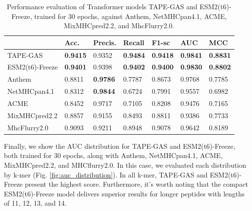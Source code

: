 \begin{table}[]
	\centering
	\caption{Performance evaluation of Transformer models TAPE-GAS and ESM2(t6)-Freeze, trained for 30 epochs, against Anthem, NetMHCpan4.1, ACME, MixMHCpred2.2, and MhcFlurry2.0.}
	\label{tab:final_comparison}
	\tiny
	\begin{tabular}{lllllll} \hline
		& \textbf{Acc.} & \textbf{Precis.} & \textbf{Recall} & \textbf{F1-sc} & \textbf{AUC}    & \textbf{MCC}    \\ \hline
		TAPE-GAS        & \textbf{0.9415}   & 0.9352             & \textbf{0.9484} & \textbf{0.9418}   & \textbf{0.9841} & \textbf{0.8831} \\
		ESM2(t6)-Freeze & \textbf{0.9401}   & 0.9398             & \textbf{0.9402} & \textbf{0.9400}   & \textbf{0.9830} & \textbf{0.8802} \\
		
		Anthem          & 0.8811            & \textbf{0.9786}    & 0.7787          & 0.8673            & 0.9768          & 0.7785          \\
		NetMHCpan4.1    & 0.8312            & \textbf{0.9844}    & 0.6724          & 0.7991            & 0.9557          & 0.6982          \\
		
		ACME            & 0.8452            & 0.9717             & 0.7105          & 0.8208            & 0.9476          & 0.7165          \\
		MixMHCpred2.2   & 0.8857            & 0.9155             & 0.8493          & 0.8811            & 0.9386          & 0.7733          \\
		MhcFlurry2.0    & 0.9093            & 0.9211             & 0.8948          & 0.9078            & 0.9642          & 0.8189 \\ \hline        
	\end{tabular}
\end{table}


Finally, we show the AUC distribution for TAPE-GAS and ESM2(t6)-Freeze, both trained for 30 epochs, along with Anthem, NetMHCpan4.1, ACME, MixMHCpred2.2, and MHCflurry2.0. In this case, we evaluated each distribution by k-mer (Fig. \ref{fig:auc_distribution}). In all k-mer, TAPE-GAS and ESM2(t6)-Freeze present the highest score. Furthermore, it's worth noting that the compact ESM2(t6)-Freeze model delivers superior results for longer peptides with lengths of 11, 12, 13, and 14.


